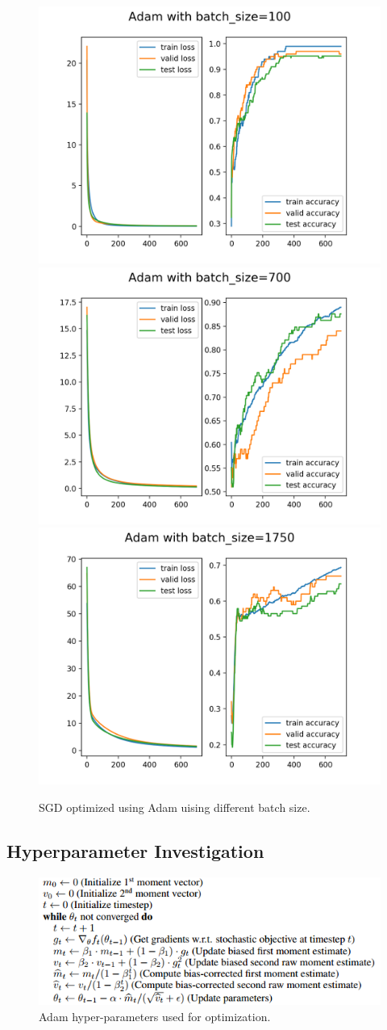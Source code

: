 \documentclass[10pt,letterpaper]{article}
\begin{document}
\begin{figure}[H]
\centering
 \begin{subfig}
  \includegraphics[width=.45\linewidth]{adam_100.png}\hfill
  \includegraphics[width=.45\linewidth]{adam_700.png}\hfill
  \includegraphics[width=.45\linewidth]{adam_1750.png}
  \caption{SGD optimized using Adam uising different batch size.}
  \end{subfig}
\end{figure}


\subsection{Hyperparameter Investigation}
\begin{figure}[H]
\centering
 \begin{subfig}
  \includegraphics[width=.5\linewidth]{08VZN.png}\hfill
  \caption{Adam hyper-parameters used for optimization. \cite{2014arXiv1412.6980K}}
  \end{subfig}
\end{figure}
\end{document}
